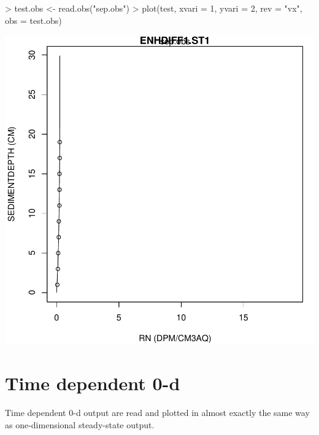 \documentclass{scrartcl}
\begin{document}
\begin{Schunk}
\begin{Sinput}
> test.obs <- read.obs("sep.obs")
> plot(test, xvari = 1, yvari = 2, rev = "vx", obs = test.obs)
\end{Sinput}
\end{Schunk}
\includegraphics{figures/f-004}

\section{Time dependent 0-d}

Time dependent 0-d output are read and plotted in almost exactly the
same way as one-dimensional steady-state output.  
\end{document}
